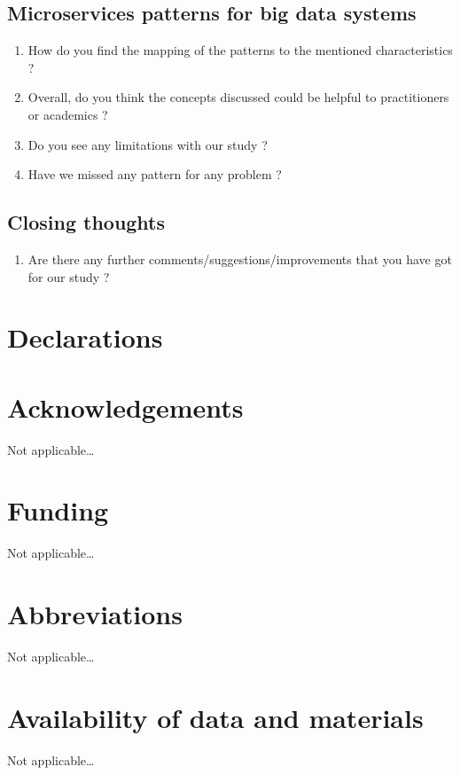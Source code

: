 \documentclass{bmcart}
\begin{document}
\begin{backmatter}
\subsection*{\textbf{Microservices patterns for big data systems}}

\begin{enumerate}
    \item How do you find the mapping of the patterns to the mentioned characteristics ? 
    \item Overall, do you think the concepts discussed could be helpful to practitioners or academics ?  
    \item Do you see any limitations with our study ? 
    \item Have we missed any pattern for any problem ?
\end{enumerate}

\subsection*{\textbf{Closing thoughts}}

\begin{enumerate}
    \item Are there any further comments/suggestions/improvements that you have got for our study ?
\end{enumerate}

\section{Declarations}

\section*{Acknowledgements}%
Not applicable\ldots

\section*{Funding}%
Not applicable\ldots

\section*{Abbreviations}%
Not applicable\ldots

\section*{Availability of data and materials}%
Not applicable\ldots


\end{backmatter}
\end{document}
